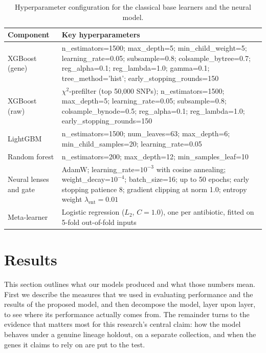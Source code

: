 \documentclass[journal]{IEEEtran}
\begin{document}
\begin{table}[!tb]
\caption{Hyperparameter configuration for the classical base learners and the neural
model.}
\label{tab:hyperparameters}
\centering
\small
\setlength{\tabcolsep}{4pt}
\renewcommand{\arraystretch}{1.05}
\begin{tabular}{|>{\raggedright\arraybackslash}p{1.9cm}|>{\raggedright\arraybackslash}p{5.7cm}|}
\hline
\rowcolor{headgrey}
\textbf{Component} & \textbf{Key hyperparameters} \\ \hline
XGBoost (gene) & n\_estimators=1500; max\_depth=5; min\_child\_weight=5; learning\_rate=0.05; subsample=0.8; colsample\_bytree=0.7; reg\_alpha=0.1; reg\_lambda=1.0; gamma=0.1; tree\_method='hist'; early\_stopping\_rounds=150 \\ \hline
XGBoost (raw) & $\chi^2$-prefilter (top 50{,}000 SNPs); n\_estimators=1500; max\_depth=5; learning\_rate=0.05; subsample=0.8; colsample\_bynode=0.5; reg\_alpha=0.1; reg\_lambda=1.0; early\_stopping\_rounds=150 \\ \hline
LightGBM & n\_estimators=1500; num\_leaves=63; max\_depth=6; min\_child\_samples=20; learning\_rate=0.05 \\ \hline
Random forest & n\_estimators=200; max\_depth=12; min\_samples\_leaf=10 \\ \hline
Neural lenses and gate & AdamW; learning\_rate=$10^{-3}$ with cosine annealing; weight\_decay=$10^{-4}$; batch\_size=16; up to 50 epochs; early stopping patience 8; gradient clipping at norm 1.0; entropy weight $\lambda_{\mathrm{ent}}=0.01$ \\ \hline
Meta-learner & Logistic regression ($L_2$, $C=1.0$), one per antibiotic, fitted on 5-fold out-of-fold inputs \\ \hline
\end{tabular}
\renewcommand{\arraystretch}{1.0}
\end{table}

\section{Results}
\label{sec:results}

This section outlines what our models produced and what those numbers mean. First
we describe the measures that we used in evaluating performance and the results of
the proposed model, and then decompose the model, layer upon layer, to see where its
performance actually comes from. The remainder turns to the evidence that matters
most for this research's central claim: how the model behaves under a genuine
lineage holdout, on a separate collection, and when the genes it claims to rely on
are put to the test.
\end{document}
